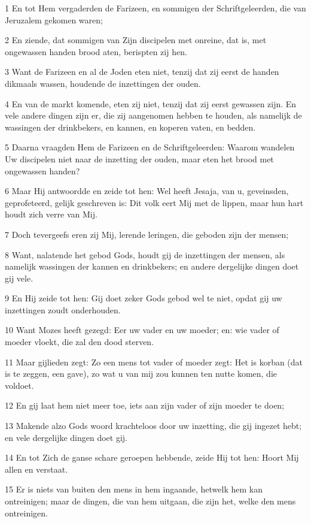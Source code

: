 \par 1 En tot Hem vergaderden de Farizeen, en sommigen der Schriftgeleerden, die van Jeruzalem gekomen waren;
\par 2 En ziende, dat sommigen van Zijn discipelen met onreine, dat is, met ongewassen handen brood aten, berispten zij hen.
\par 3 Want de Farizeen en al de Joden eten niet, tenzij dat zij eerst de handen dikmaals wassen, houdende de inzettingen der ouden.
\par 4 En van de markt komende, eten zij niet, tenzij dat zij eerst gewassen zijn. En vele andere dingen zijn er, die zij aangenomen hebben te houden, als namelijk de wassingen der drinkbekers, en kannen, en koperen vaten, en bedden.
\par 5 Daarna vraagden Hem de Farizeen en de Schriftgeleerden: Waarom wandelen Uw discipelen niet naar de inzetting der ouden, maar eten het brood met ongewassen handen?
\par 6 Maar Hij antwoordde en zeide tot hen: Wel heeft Jesaja, van u, geveinsden, geprofeteerd, gelijk geschreven is: Dit volk eert Mij met de lippen, maar hun hart houdt zich verre van Mij.
\par 7 Doch tevergeefs eren zij Mij, lerende leringen, die geboden zijn der mensen;
\par 8 Want, nalatende het gebod Gods, houdt gij de inzettingen der mensen, als namelijk wassingen der kannen en drinkbekers; en andere dergelijke dingen doet gij vele.
\par 9 En Hij zeide tot hen: Gij doet zeker Gods gebod wel te niet, opdat gij uw inzettingen zoudt onderhouden.
\par 10 Want Mozes heeft gezegd: Eer uw vader en uw moeder; en: wie vader of moeder vloekt, die zal den dood sterven.
\par 11 Maar gijlieden zegt: Zo een mens tot vader of moeder zegt: Het is korban (dat is te zeggen, een gave), zo wat u van mij zou kunnen ten nutte komen, die voldoet.
\par 12 En gij laat hem niet meer toe, iets aan zijn vader of zijn moeder te doen;
\par 13 Makende alzo Gods woord krachteloos door uw inzetting, die gij ingezet hebt; en vele dergelijke dingen doet gij.
\par 14 En tot Zich de ganse schare geroepen hebbende, zeide Hij tot hen: Hoort Mij allen en verstaat.
\par 15 Er is niets van buiten den mens in hem ingaande, hetwelk hem kan ontreinigen; maar de dingen, die van hem uitgaan, die zijn het, welke den mens ontreinigen.
